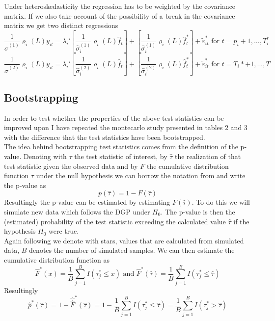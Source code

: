 \documentclass[12pt]{article}
\begin{document}
Under heteroskedasticity the regression has to be weighted by the covariance matrix. If we also take account of the possibility of a break in the covariance matrix we get two distinct regressions
$$\frac{1}{\hat \sigma^{(1)}} \varrho_i(L) y_{it} = \lambda_i' \left[\frac{1}{\hat \sigma_i^{(1)}} \varrho_i(L) \hat f_t\right] + \left[\frac{1}{\hat \sigma_i^{(1)}} \varrho_i(L) \hat f_t^*\right] + \tilde \varepsilon^*_{it} \text{ for } t = p_i+1, ..., T^*_i$$
$$\frac{1}{\hat \sigma^{(2)}} \varrho_i(L) y_{it} = \lambda_i' \left[\frac{1}{\hat \sigma_i^{(2)}} \varrho_i(L) \hat f_t\right] + \left[\frac{1}{\hat \sigma_i^{(2)}} \varrho_i(L) \hat f_t^*\right] + \tilde \varepsilon^*_{it} \text{ for } t = T_i*+1, ..., T$$



\subsection{Bootstrapping \citet{breitung2011testing}}
In order to test whether the properties of the above test statistics can be improved upon I have repeated the montecarlo study presented in \citet{breitung2011testing} tables 2 and 3 with the difference that the test statistics have been bootstrapped. \\

The idea behind bootstrapping test statistics comes from the definition of the p-value. Denoting with $\tau$ the test statistic of interest, by $\hat \tau$ the realization of that test statistic given the observed data and by $F$ the cumulative distribution function $\tau$ under the null hypothesis we can borrow the notation from \citet{davidson2004econometric} and write the p-value as
$$p(\hat \tau) = 1 - F(\hat \tau)$$
Resultingly the p-value can be estimated by estimating $F(\hat \tau)$. To do this we will simulate new data which follows the DGP under $H_0$. The p-value is then the (estimated) probability of the test statistic exceeding the calculated value $\hat \tau$ if the hypothesis $H_0$ were true. \\

Again following \citet{davidson2004econometric} we denote with stars, values that are calculated from simulated data, $B$ denotes the number of simulated samples. We can then estimate the cumulative distribution function as 
$$\hat F^*(x) = \frac{1}{B} \sum_{j=1}^B I(\tau^*_j \leq x) \text{ and } \hat F^*(\hat \tau) = \frac{1}{B} \sum_{j=1}^B I(\tau^*_j \leq \hat \tau)$$
Resultingly
$$\hat p^*(\hat \tau) = 1 - \hat \hat F^*(\hat \tau) = 1 - \frac{1}{B} \sum_{j=1}^B I (\tau^*_j \leq \hat \tau) = \frac{1}{B}\sum_{j=1}^B I(\tau^*_j > \hat \tau)$$
\end{document}
